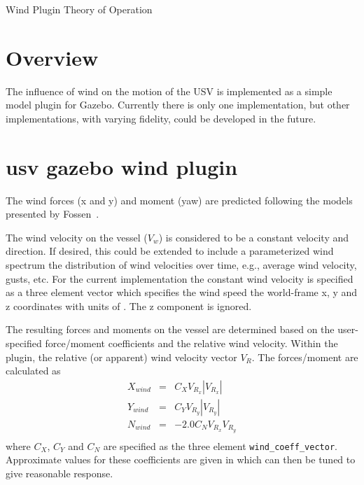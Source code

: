 \documentclass[11pt]{article}
\newcommand{\doctitle}{Wind Plugin Theory of Operation}
\begin{document}
\newpage
\setcounter{page}{1}
\begin{center}
{\huge \doctitle}
\end{center}

\section{Overview}

The influence of wind on the motion of the USV is implemented as a simple model plugin for Gazebo.  Currently there is only one implementation, but other implementations, with varying fidelity, could be developed in the future.


\section{usv gazebo wind plugin}

The wind forces (x and y) and moment (yaw) are predicted following the models presented by Fossen~\cite{fossen94guidance}.

The wind velocity on the vessel ($V_w$) is considered to be a constant velocity and direction.  If desired, this could be extended to include a parameterized wind spectrum the distribution of wind velocities over time, e.g., average wind velocity, gusts, etc.  For the current implementation the constant wind velocity is specified as a three element vector which specifies the wind speed the world-frame x, y and z coordinates with units of .  The z component is ignored.

The resulting forces and moments on the vessel are determined based on the user-specified force/moment coefficients and the relative wind velocity.  Within the plugin, the relative (or apparent) wind velocity vector $V_R$.  The forces/moment are calculated as
\begin{eqnarray}
  X_{wind} &=& C_X V_{R_x} |V_{R_x}| \\
  Y_{wind} &=& C_Y V_{R_y} |V_{R_y}| \\
  N_{wind} &=& -2.0 C_N V_{R_x} V_{R_y} \\
\end{eqnarray}
where $C_X$, $C_Y$ and $C_N$ are specified as the three element \verb+wind_coeff_vector+.  Approximate values for these coefficients are given in \cite{sarda17station} which can then be tuned to give reasonable response.



\end{document}
